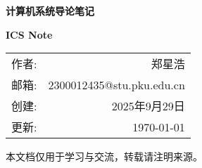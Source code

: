\providecommand{\CoverTitle}{计算机系统导论笔记}
\providecommand{\CoverSubtitle}{ICS Note}
\providecommand{\CoverAuthor}{郑星浩}
\providecommand{\CoverEmail}{2300012435@stu.pku.edu.cn}
\providecommand{\CoverDateCreated}{2025年9月29日}

\providecommand{\CoverDisclaimer}{本文档仅用于学习与交流，转载请注明来源。}

\begin{titlepage}
    \thispagestyle{empty}
    \centering
    \vspace*{2cm}

    {\Huge\bfseries\color{black} \CoverTitle\par}
    \vspace{1.0cm}
    {\Large\bfseries\color{gray} \CoverSubtitle\par}

    \vspace{2.5cm}
    \begin{tcolorbox}[
            colback=white,
            colframe=gray!40!white,
            width=0.6\textwidth,
            boxrule=0.5pt,
            sharp corners,
            nobeforeafter,
            coltitle=black,
            left=4mm,
            right=4mm
        ]
        \centering
        \renewcommand{\arraystretch}{1.2}
        \begin{tabular}{lr}
            作者: & \CoverAuthor      \\
            邮箱: & \CoverEmail       \\
            创建: & \CoverDateCreated \\
            更新: & \today            \\
        \end{tabular}
    \end{tcolorbox}

    \vfill
    {\small \CoverDisclaimer\par}
    \vspace{0.6cm}
\end{titlepage}
\newpage


\tableofcontents
\newpage

